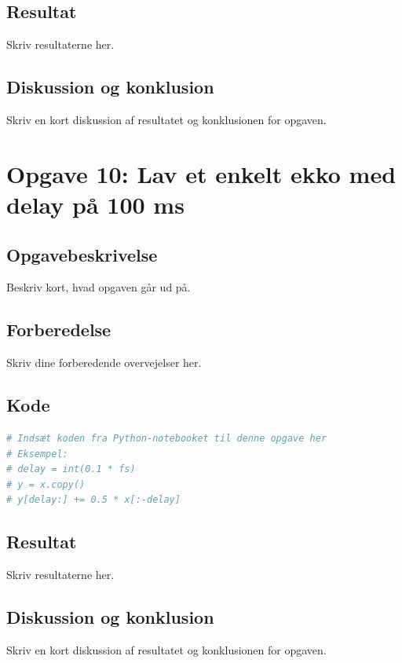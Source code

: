 ﻿\documentclass[11pt,a4paper]{report}
\begin{document}
\subsection{Resultat}
Skriv resultaterne her.

\subsection{Diskussion og konklusion}
Skriv en kort diskussion af resultatet og konklusionen for opgaven.

\newpage

\section{Opgave 10: Lav et enkelt ekko med delay på 100 ms}
\subsection{Opgavebeskrivelse}
Beskriv kort, hvad opgaven går ud på.

\subsection{Forberedelse}
Skriv dine forberedende overvejelser her.

\subsection{Kode}
\begin{lstlisting}[language=Python]
# Indsæt koden fra Python-notebooket til denne opgave her
# Eksempel:
# delay = int(0.1 * fs)
# y = x.copy()
# y[delay:] += 0.5 * x[:-delay]
\end{lstlisting}

\subsection{Resultat}
Skriv resultaterne her.

\subsection{Diskussion og konklusion}
Skriv en kort diskussion af resultatet og konklusionen for opgaven.
\end{document}
